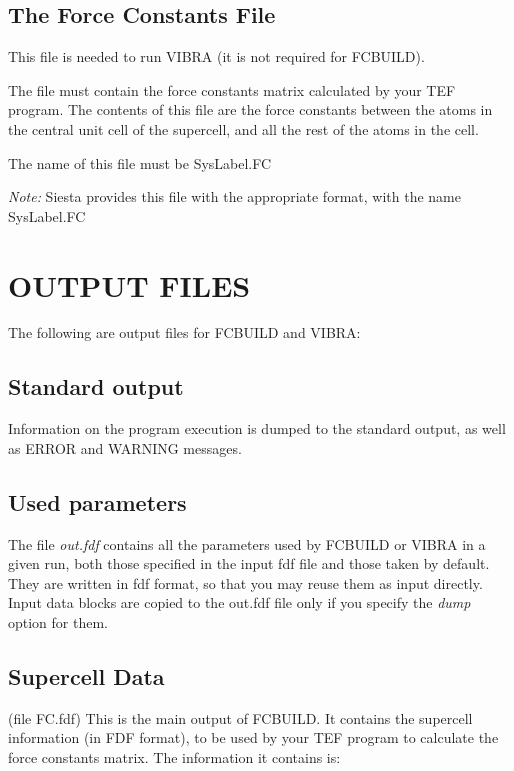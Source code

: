 \subsection{The Force Constants File}

\noindent
This file is needed to run VIBRA (it is not required for
FCBUILD).  

\noindent
The file must contain the force constants matrix calculated
by your TEF program. The contents of this file
are the force constants between the atoms in the central
unit cell of the supercell, and all the rest of the
atoms in the cell. 

\noindent
The name of this file must be SysLabel.FC

\noindent
{\it Note:} Siesta provides this file with the appropriate
format, with the name SysLabel.FC

\section{OUTPUT FILES}

The following are output files for FCBUILD and VIBRA:

\subsection{Standard output}
Information on the program execution is dumped to the standard
output, as well as ERROR and WARNING messages.


\subsection{Used parameters}
The file {\it out.fdf} contains all the parameters used by FCBUILD
or VIBRA
in a given run, both those specified in the input fdf file and
those taken by default. They are written in fdf format, so that
you may reuse them as input directly. Input data blocks are 
copied to the out.fdf file only if you specify the {\it dump} option
for them.

\subsection{Supercell Data}
(file FC.fdf)
This is the main output of FCBUILD. It contains the supercell
information (in FDF format), to be used by your TEF program
to calculate the force constants matrix.
The information it contains is:

